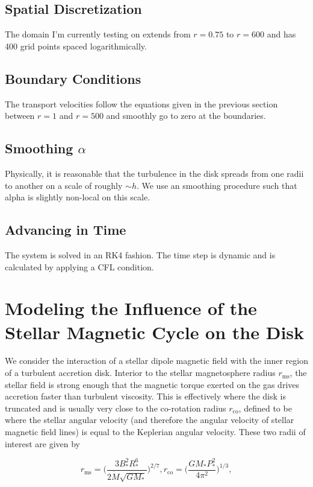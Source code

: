 \subsection{Spatial Discretization}
The domain I'm currently testing on extends from $r=0.75$ to $r=600$ and has 400 grid points spaced logarithmically. 


\subsection{Boundary Conditions}
The transport velocities follow the equations given in the previous section between $r=1$ and $r=500$ and smoothly go to zero at the boundaries.  


\subsection{Smoothing $\alpha$}
Physically, it is reasonable that the turbulence in the disk spreads from one radii to another on a scale of roughly $\sim h$.  We use an smoothing procedure such that alpha is slightly non-local on this scale. 


\subsection{Advancing in Time}
The system is solved in an RK4 fashion.  The time step is dynamic and is calculated by applying a CFL condition. 





\section{Modeling the Influence of the Stellar Magnetic Cycle on the Disk}
We consider the interaction of a stellar dipole magnetic field with the inner region of a turbulent accretion disk. Interior to the stellar magnetosphere radius $r_{\text{ms}}$, the stellar field is strong enough that the magnetic torque exerted on the gas drives accretion faster than turbulent viscosity.  This is effectively where the disk is truncated and is usually very close to the co-rotation radius $r_{\text{co}}$, defined to be where the stellar angular velocity (and therefore the angular velocity of stellar magnetic field lines) is equal to the Keplerian angular velocity.  These two radii of interest are given by

\begin{equation}
r_{\text{ms}} = \Bigg(\frac{3 B_*^2 R_*^6}{2 \dot{M} \sqrt{G M_*}}\Bigg)^{2/7}, r_{\text{co}} = \Bigg( \frac{G M_* P_*^2}{4\pi^2} \Bigg)^{1/3},
\end{equation} 


